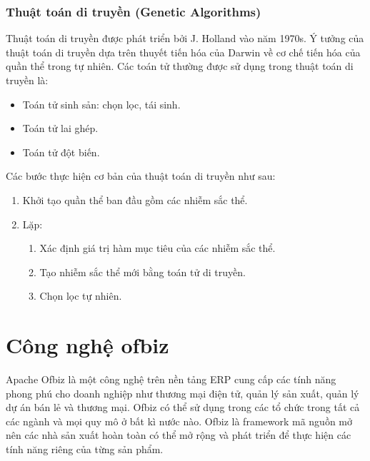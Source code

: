 \documentclass[a4paper,12pt]{report}
\begin{document}
\subsubsection{Thuật toán di truyền (Genetic Algorithms)}
Thuật toán di truyền \cite{MTH} được phát triển bởi J. Holland vào năm 1970s. Ý tưởng của thuật toán di truyền dựa trên thuyết tiến hóa của Darwin về cơ chế tiến hóa của quần thể trong tự nhiên. Các toán tử thường được sử dụng trong thuật toán di truyền là:
\begin{itemize}
\item Toán tử sinh sản: chọn lọc, tái sinh.
\item Toán tử lai ghép.
\item Toán tử đột biến.
\end{itemize} 
Các bước thực hiện cơ bản của thuật toán di truyền như sau:
\begin{enumerate}
\item Khởi tạo quần thể ban đầu gồm các nhiễm sắc thể.
\item Lặp:
\begin{enumerate}

\item Xác định giá trị hàm mục tiêu của các nhiễm sắc thể.
\item Tạo nhiễm sắc thể mới bằng toán tử di truyền.
\item Chọn lọc tự nhiên.

\end{enumerate}
\end{enumerate}
\section{Công nghệ ofbiz}
\label{section:ofbiz}
Apache Ofbiz \cite{AOW} là một công nghệ trên nền tảng \ac{ERP} cung cấp các tính năng phong phú cho doanh nghiệp như thương mại điện tử, quản lý sản xuất,  quản lý dự án bán lẻ và thương mại. Ofbiz có thể sử dụng trong các tổ chức trong tất cả các ngành và mọi quy mô ở bất kì nước nào. Ofbiz là framework mã nguồn mở nên các nhà sản xuất hoàn toàn có thể mở rộng và phát triển để thực hiện các tính năng riêng của từng sản phẩm. \\
\end{document}
